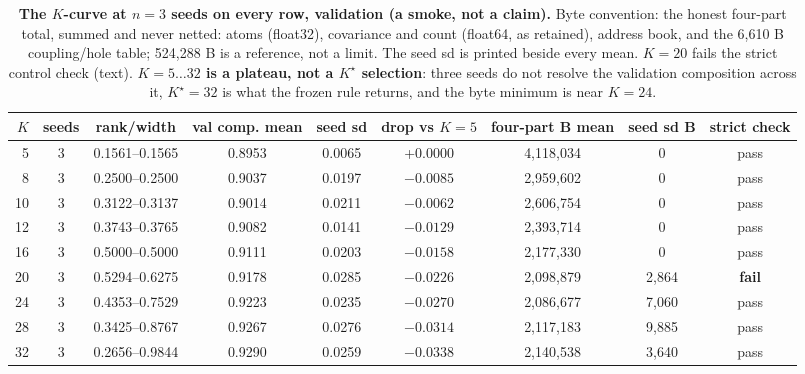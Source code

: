 \documentclass{article} %
\newcommand{\Kstar}{\ensuremath{K^{\star}}}
\begin{document}
\begin{table}[h]
\centering\small
\caption{\textbf{The $K$-curve at $n=3$ seeds on every row, validation (a smoke, not a claim).} %
Byte convention: the honest four-part total, summed and never netted: atoms (float32), covariance
and count (float64, as retained), address book, and the 6,610 B coupling/hole table; 524,288 B is a %
reference, not a limit. The seed sd is printed beside every mean. $K=20$ fails the strict control check (text). %
\textbf{$K=5\ldots32$ is a plateau, not a $\Kstar$ selection}: three seeds do not resolve the validation %
composition across it, $\Kstar=32$ is what the frozen rule returns, and the byte minimum is near $K=24$.} %
\label{tab:kcurve3}
\setlength{\tabcolsep}{2.4pt}
\begin{adjustbox}{max width=\linewidth}\begin{tabular}{rcccccccc}
\toprule
$K$ & seeds & rank/width & val comp. mean & seed sd & drop vs $K{=}5$ & four-part B mean & seed sd B & strict check \\
\midrule
5 & 3 & 0.1561--0.1565 & 0.8953 & 0.0065 & +0.0000 & 4,118,034 & 0 & pass \\
8 & 3 & 0.2500--0.2500 & 0.9037 & 0.0197 & $-0.0085$ & 2,959,602 & 0 & pass \\
10 & 3 & 0.3122--0.3137 & 0.9014 & 0.0211 & $-0.0062$ & 2,606,754 & 0 & pass \\
12 & 3 & 0.3743--0.3765 & 0.9082 & 0.0141 & $-0.0129$ & 2,393,714 & 0 & pass \\
16 & 3 & 0.5000--0.5000 & 0.9111 & 0.0203 & $-0.0158$ & 2,177,330 & 0 & pass \\
20 & 3 & 0.5294--0.6275 & 0.9178 & 0.0285 & $-0.0226$ & 2,098,879 & 2,864 & \textbf{fail} \\
24 & 3 & 0.4353--0.7529 & 0.9223 & 0.0235 & $-0.0270$ & 2,086,677 & 7,060 & pass \\
28 & 3 & 0.3425--0.8767 & 0.9267 & 0.0276 & $-0.0314$ & 2,117,183 & 9,885 & pass \\
32 & 3 & 0.2656--0.9844 & 0.9290 & 0.0259 & $-0.0338$ & 2,140,538 & 3,640 & pass \\
\bottomrule
\end{tabular}\end{adjustbox}
\end{table} %
\end{document}

